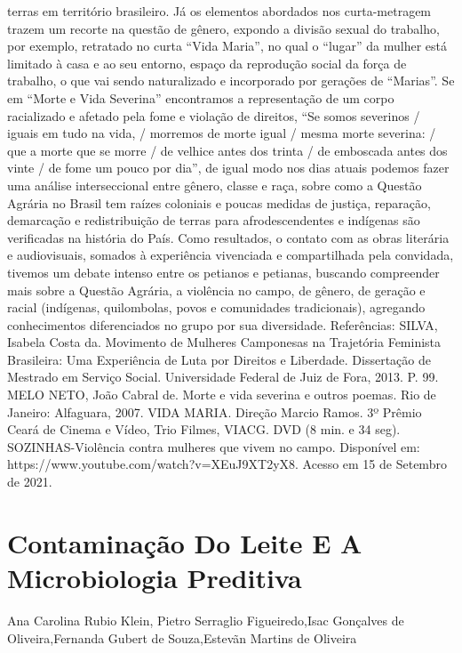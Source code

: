 terras em território brasileiro. Já os elementos abordados nos curta-metragem trazem um recorte 
na questão de gênero, expondo a divisão sexual do trabalho, por exemplo, retratado no curta “Vida 
Maria”, no qual o “lugar” da mulher está limitado à casa e ao seu entorno, espaço da reprodução 
social da força de trabalho, o que vai sendo naturalizado e incorporado por gerações de “Marias”.
Se em “Morte e Vida Severina” encontramos a representação de um corpo racializado e 
afetado pela fome e violação de direitos, “Se somos severinos / iguais em tudo na vida, / morremos 
de morte igual / mesma morte severina: / que a morte que se morre / de velhice antes dos trinta / 
de emboscada antes dos vinte / de fome um pouco por dia”, de igual modo nos dias atuais podemos 
fazer uma análise interseccional entre gênero, classe e raça, sobre como a Questão Agrária no 
Brasil tem raízes coloniais e poucas medidas de justiça, reparação, demarcação e redistribuição de 
terras para afrodescendentes e indígenas são verificadas na história do País.
Como resultados, o contato com as obras literária e audiovisuais, somados à experiência 
vivenciada e compartilhada pela convidada, tivemos um debate intenso entre os petianos e 
petianas, buscando compreender mais sobre a Questão Agrária, a violência no campo, de gênero, 
de geração e racial (indígenas, quilombolas, povos e comunidades tradicionais), agregando 
conhecimentos diferenciados no grupo por sua diversidade. 
Referências:
SILVA, Isabela Costa da. Movimento de Mulheres Camponesas na Trajetória Feminista 
Brasileira: Uma Experiência de Luta por Direitos e Liberdade. Dissertação de Mestrado em 
Serviço Social. Universidade Federal de Juiz de Fora, 2013. P. 99.
MELO NETO, João Cabral de. Morte e vida severina e outros poemas. Rio de Janeiro: Alfaguara, 
2007.
VIDA MARIA. Direção Marcio Ramos. 3º Prêmio Ceará de Cinema e Vídeo, Trio Filmes, 
VIACG. DVD (8 min. e 34 seg).
SOZINHAS-Violência contra mulheres que vivem no campo. Disponível em: 
https://www.youtube.com/watch?v=XEuJ9XT2yX8. Acesso em 15 de Setembro de 2021.




\section*{Contaminação Do Leite E A Microbiologia Preditiva}

Ana Carolina Rubio Klein, Pietro Serraglio Figueiredo,Isac Gonçalves de Oliveira,Fernanda Gubert de Souza,Estevãn Martins de Oliveira

